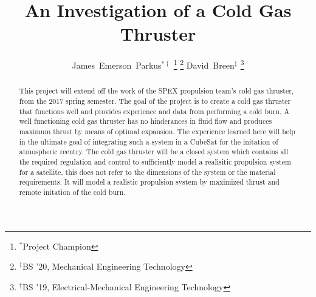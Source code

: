 \documentclass[conference]{IEEEtran} %
\title{An Investigation of a Cold Gas Thruster}
\author{
  \IEEEauthorblockN{%
    James~Emerson~Parkus\IEEEauthorrefmark{1},  %
    David~Breen\IEEEauthorrefmark{2}
  }
  \IEEEauthorblockA{%
    RIT Space Exploration, Rochester Institute of Technology \\ %
    Rochester, N.Y. \\
    Email:
    \IEEEauthorrefmark{1}jep7631@rit.edu,
    \IEEEauthorrefmark{2}djb1410@rit.edu
}
   James~Emerson~Parkus$^{*\dagger}$%
     \thanks{$^{*}$Project Champion}%
     \thanks{$^{\dagger}$BS '20, Mechanical Engineering Technology}
   David~Breen$^{\ddagger}$%
     \thanks{$^{\ddagger}$BS '19, Electrical-Mechanical Engineering Technology}

}
\begin{document}
\maketitle%

\begin{abstract}
  This project will extend off the work of the SPEX propulsion team's cold gas thruster, from the 2017 spring semester. The goal of the project is
  to create a cold gas thruster that functions well and provides experience and data from performing a cold burn. A well functioning cold gas thruster has no
  hinderances in fluid flow and produces maximum thrust by means of optimal expansion.
  The experience learned here will help in the ultimate goal of integrating such a system in a CubeSat for the initation of atmospheric reentry. The cold gas thruster will be a
  closed system which contains all the required regulation and control to sufficiently model a realisitic propulsion system for a satellite, this does not refer
  to the dimensions of the system or the material requirements. It will model a realistic propulsion system by maximized thrust and remote initation of
  the cold burn.

\end{abstract}
\end{document}
